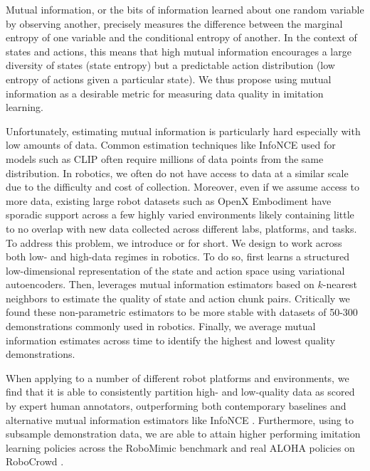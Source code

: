 Mutual information, or the bits of information learned about one random variable by observing another, precisely measures the difference between the marginal entropy of one variable and the conditional entropy of another. In the context of states and actions, this means that high mutual information encourages a large diversity of states (state entropy) but a predictable action distribution (low entropy of actions given a particular state). We thus propose using mutual information as a desirable metric for measuring data quality in imitation learning.

Unfortunately, estimating mutual information is particularly hard especially with low amounts of data. Common estimation techniques like InfoNCE \citep{oord2018representation} used for models such as CLIP \citep{radford2021learning} often require millions of data points from the same distribution. In robotics, we often do not have access to data at a similar scale due to the difficulty and cost of collection. Moreover, even if we assume access to more data, existing large robot datasets such as OpenX Embodiment \citep{openx} have sporadic support across a few highly varied environments likely containing little to no overlap with new data collected across different labs, platforms, and tasks. To address this problem, we introduce \fullname or \abv for short. We design \abv to work across both low- and high-data regimes in robotics. To do so, \abv first learns a structured low-dimensional representation of the state and action space using variational autoencoders. Then, \abv leverages mutual information estimators based on $k$-nearest neighbors to estimate the quality of state and action chunk pairs. Critically we found these non-parametric estimators to be more stable with datasets of 50-300 demonstrations commonly used in robotics. Finally, we average mutual information estimates across time to identify the highest and lowest quality demonstrations.

When applying \abv to a number of different robot platforms and environments, we find that it is able to consistently partition high- and low-quality data as scored by expert human annotators, outperforming both contemporary baselines and alternative mutual information estimators like InfoNCE \citep{oord2018representation}. Furthermore, using \abv to subsample demonstration data, we are able to attain higher performing imitation learning policies across the RoboMimic \citep{robomimic} benchmark and real ALOHA policies on RoboCrowd \citet{mirchandani2024robocrowd}.
